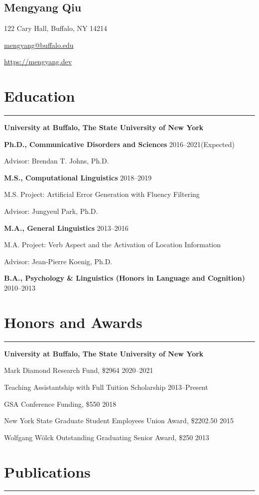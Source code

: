 \documentclass[11pt]{article}
\newcommand{\name}[1]{\begin{center}\section*{\Huge #1}\end{center}}
\newcommand{\topinfo}[1]{\begin{center}\vspace{-0.2cm}#1\vspace{-0.2cm}\end{center}}
\newcommand{\resumesection}[1]{\vspace{-0.2cm}\section*{#1}\vspace{-0.2cm}\hrule\vspace{0.2cm}}
\begin{document}
\name{Mengyang Qiu}
\topinfo{122 Cary Hall, Buffalo, NY 14214}
\topinfo{\href{mailto:mengyang@buffalo.edu}{mengyang@buffalo.edu}}
\topinfo{\url{https://mengyang.dev}}

\resumesection{Education}
\textbf{University at Buffalo, The State University of New York}

\textbf{Ph.D., Communicative Disorders and Sciences} \hfill 2016--2021(Expected)

\quad Advisor: Brendan T. Johns, Ph.D.

\textbf{M.S., Computational Linguistics} \hfill 2018--2019

\quad M.S. Project: Artificial Error Generation with Fluency Filtering

\quad Advisor: Jungyeul Park, Ph.D.

\textbf{M.A., General Linguistics} \hfill 2013--2016

\quad M.A. Project: Verb Aspect and the Activation of Location Information

\quad Advisor: Jean-Pierre Koenig, Ph.D.

\textbf{B.A., Psychology \& Linguistics (Honors in Language and Cognition)} \hfill 2010--2013


\resumesection{Honors and Awards}
\textbf{University at Buffalo, The State University of New York}

Mark Diamond Research Fund, \$2964 \hfill 2020--2021

Teaching Assistantship with Full Tuition Scholarship \hfill 2013--Present

GSA Conference Funding, \$550 \hfill 2018

New York State Graduate Student Employees Union Award, \$2202.50 \hfill 2015

Wolfgang W{\"o}lck Outstanding Graduating Senior Award, \$250 \hfill 2013


\resumesection{Publications}
\end{document}

